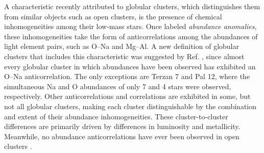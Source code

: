 A characteristic recently attributed to globular clusters, which distinguishes them from similar objects such as open clusters, is the presence of chemical inhomogeneities among their low-mass stars. Once labeled \emph{abundance anomalies}, these inhomogeneities take the form of anticorrelations among the abundances of light element pairs, such as O--Na and Mg--Al. A new definition of globular clusters that includes this characteristic was suggested by Ref. \cite{Carretta2010}, since almost every globular cluster in which abundances have been observed has exhibited an O--Na anticorrelation. 
The only exceptions are Terzan 7 and Pal 12, where the simultaneous Na and O abundances of only 7 \cite{Sbordone2007} and 4 \cite{Cohen2004} stars were observed, respectively. Other anticorrelations and correlations are exhibited in some, but not all globular clusters, making each cluster distinguishable by the combination and extent of their abundance inhomogeneities. These cluster-to-cluster differences are primarily driven by differences in luminosity and metallicity. Meanwhile, no abundance anticorrelations have ever been observed in open clusters \cite{Gratton2019}.

